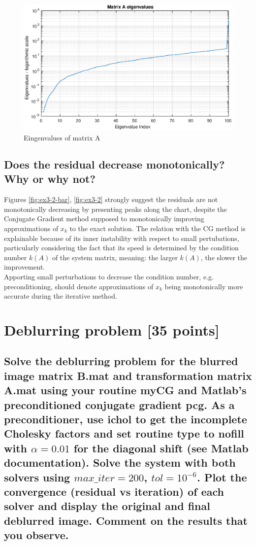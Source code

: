 \documentclass[unicode,11pt,a4paper,oneside,numbers=endperiod,openany]{scrartcl}
\begin{document}
\begin{figure}[H]
    \centering
    \caption{Eingenvalues of matrix A}
    \label{fig:ex3-3}
    \includegraphics[width=\textwidth, trim={0cm 0cm 0cm 0cm}, clip]{./figures/ex3-3.eps}
\end{figure}

\subsection{Does the residual decrease monotonically? Why or why not?}

Figures \ref{fig:ex3-2-bar}, \ref{fig:ex3-2} strongly suggest the residuals are not monotonically decreasing
by presenting peaks along the chart,
despite the Conjugate Gradient method supposed to monotonically improving approximations of $x_k$
to the exact solution.
The relation with the CG method is explainable because of its inner instability
with respect to small pertubations, particularly considering the fact that its speed is determined
by the condition number $k(A)$ of the system matrix, meaning: the larger $k(A)$, the slower the improvement.\\

Apporting small perturbations to decrease the condition number, e.g. preconditioning,
should denote approximations of $x_k$ being monotonically more accurate during the iterative method.

\section{Deblurring problem [35 points]}

\subsection{Solve the deblurring problem for the blurred image matrix B.mat
    and transformation matrix A.mat using your routine myCG and Matlab's preconditioned conjugate gradient pcg.
    As a preconditioner, use ichol to get the incomplete Cholesky factors and set routine type to nofill
    with $\alpha = 0.01$ for the diagonal shift (see Matlab documentation).
    Solve the system with both solvers using $max\_iter = 200$, $tol = 10^{-6}$.
    Plot the convergence (residual vs iteration) of each solver and display the original and final deblurred image.
    Comment on the results that you observe.}
\end{document}

